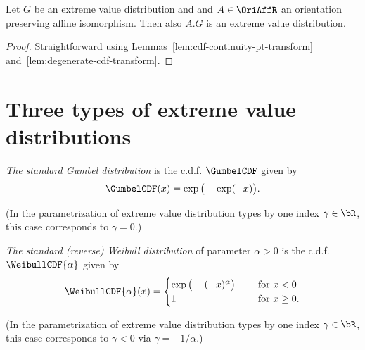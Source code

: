 \begin{lemma}
  \label{lem:extr-val-distr-transform}
  \leanok
  Let $G$ be an extreme value distribution and
  and $A \in \OriAffR$ an orientation preserving affine isomorphism.
  Then also $A.G$ is an extreme value distribution.
\end{lemma}
\begin{proof}
  \leanok
  Straightforward using Lemmas~\ref{lem:cdf-continuity-pt-transform}
  and~\ref{lem:degenerate-cdf-transform}.
\end{proof}



\section{Three types of extreme value distributions}

\begin{definition}
  \label{def:std-Gumbel-cdf}
  \emph{The standard Gumbel distribution} is the c.d.f. $\GumbelCDF$ given by
  \begin{align*}
  \GumbelCDF (x) = \exp\big(-\exp(-x)\big) .
  \end{align*}

  (In the parametrization of extreme value distribution types by one
  index $\gamma \in \bR$, this case corresponds to $\gamma = 0$.)
\end{definition}

\begin{definition}
  \label{def:std-Weibull-cdf}
  \emph{The standard (reverse) Weibull distribution} of parameter
  $\alpha > 0$ is the c.d.f. $\WeibullCDF{\alpha}$ given by
  \begin{align*}
  \WeibullCDF{\alpha} (x) = \begin{cases}
      \exp \big( - (-x)^\alpha \big) \quad & \text{ for } x < 0 \\
      1 \quad & \text{ for } x \ge 0 .
    \end{cases}
  \end{align*}

  (In the parametrization of extreme value distribution types by one
  index $\gamma \in \bR$, this case corresponds to $\gamma < 0$
  via $\gamma = -1/\alpha$.)
\end{definition}

